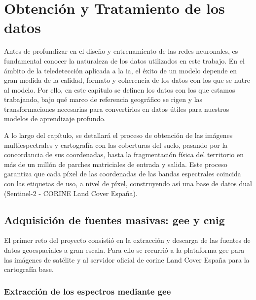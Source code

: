 \chapter[Obtención y Tratamiento de los datos]{Obtención y Tratamiento de los datos}
\label{cp:obtencion}

Antes de profundizar en el diseño y entrenamiento de las redes neuronales, es fundamental conocer la naturaleza de los datos utilizados en 
este trabajo. En el ámbito de la teledetección aplicada a la \acrshort{ia}, el éxito de un modelo depende en gran medida de la calidad, formato
y coherencia de los datos con los que se nutre al modelo. Por ello, en este capítulo se definen los datos con los que estamos trabajando, bajo
qué marco de referencia geográfico se rigen y las transformaciones necesarias para convertirlos en datos útiles para nuestros modelos de 
aprendizaje profundo.


A lo largo del capítulo, se detallará el proceso de obtención de las imágenes multiespectrales y cartografía con las coberturas del suelo, pasando
por la concordancia de sus coordenadas, hasta la fragmentación física del territorio en más de un millón de parches matriciales de entrada y salida.
Este proceso garantiza que cada píxel de las coordenadas de las bandas espectrales coincida con las etiquetas de uso, a nivel de píxel, construyendo
así una base de datos dual (Sentinel-2 - CORINE Land Cover España).  

\section{Adquisición de fuentes masivas: \acrlong{gee} y \acrshort{cnig}}
\label{data_source}

El primer reto del proyecto consistió en la extracción y descarga de las fuentes de datos geoespaciales a gran escala. Para ello se recurrió a
la plataforma \acrfull{gee} para las imágenes de satélite y al servidor oficial de \acrshort{corine} Land Cover España para la cartografía base.


\subsection{Extracción de los espectros mediante \acrshort{gee}}

